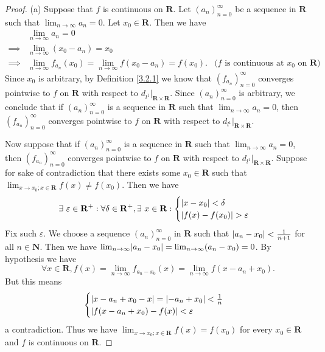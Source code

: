 \begin{proof}{(a)}
    Suppose that \(f\) is continuous on \(\mathbf{R}\).
    Let \((a_n)_{n = 0}^\infty\) be a sequence in \(\mathbf{R}\) such that \(\lim_{n \to \infty} a_n = 0\).
    Let \(x_0 \in \mathbf{R}\).
    Then we have
    \begin{align*}
                 & \lim_{n \to \infty} a_n = 0                                                                                                               \\
        \implies & \lim_{n \to \infty} (x_0 - a_n) = x_0                                                                                                     \\
        \implies & \lim_{n \to \infty} f_{a_n}(x_0) = \lim_{n \to \infty} f(x_0 - a_n) = f(x_0). & \text{(\(f\) is continuous at \(x_0\) on \(\mathbf{R}\))}
    \end{align*}
    Since \(x_0\) is arbitrary, by Definition \ref{3.2.1} we know that \((f_{a_n})_{n = 0}^\infty\) converges pointwise to \(f\) on \(\mathbf{R}\) with respect to \(d_{l^1}|_{\mathbf{R} \times \mathbf{R}}\).
    Since \((a_n)_{n = 0}^\infty\) is arbitrary, we conclude that if \((a_n)_{n = 0}^\infty\) is a sequence in \(\mathbf{R}\) such that \(\lim_{n \to \infty} a_n = 0\), then \((f_{a_n})_{n = 0}^\infty\) converges pointwise to \(f\) on \(\mathbf{R}\) with respect to \(d_{l^1}|_{\mathbf{R} \times \mathbf{R}}\).

    Now suppose that if \((a_n)_{n = 0}^\infty\) is a sequence in \(\mathbf{R}\) such that \(\lim_{n \to \infty} a_n = 0\), then \((f_{a_n})_{n = 0}^\infty\) converges pointwise to \(f\) on \(\mathbf{R}\) with respect to \(d_{l^1}|_{\mathbf{R} \times \mathbf{R}}\).
    Suppose for sake of contradiction that there exists some \(x_0 \in \mathbf{R}\) such that \(\lim_{x \to x_0 ; x \in \mathbf{R}} f(x) \neq f(x_0)\).
    Then we have
    \[
        \exists\ \varepsilon \in \mathbf{R}^+ : \forall \delta \in \mathbf{R}^+, \exists\ x \in \mathbf{R} : \begin{cases}
            \abs*{x - x_0} < \delta \\
            \abs*{f(x) - f(x_0)} > \varepsilon
        \end{cases}
    \]
    Fix such \(\varepsilon\).
    We choose a sequence \((a_n)_{n = 0}^\infty\) in \(\mathbf{R}\) such that \(\abs*{a_n - x_0} < \frac{1}{n + 1}\) for all \(n \in \mathbf{N}\).
    Then we have \(\lim_{n \to \infty} \abs*{a_n - x_0} = \lim_{n \to \infty} (a_n - x_0) = 0\).
    By hypothesis we have
    \[
        \forall x \in \mathbf{R}, f(x) = \lim_{n \to \infty} f_{a_n - x_0}(x) = \lim_{n \to \infty} f(x - a_n + x_0).
    \]
    But this means
    \[
        \begin{cases}
            \abs*{x - a_n + x_0 - x} = \abs*{-a_n + x_0} < \frac{1}{n} \\
            \abs*{f(x - a_n + x_0) - f(x)} < \varepsilon
        \end{cases}
    \]
    a contradiction.
    Thus we have \(\lim_{x \to x_0 ; x \in \mathbf{R}} f(x) = f(x_0)\) for every \(x_0 \in \mathbf{R}\) and \(f\) is continuous on \(\mathbf{R}\).
\end{proof}

